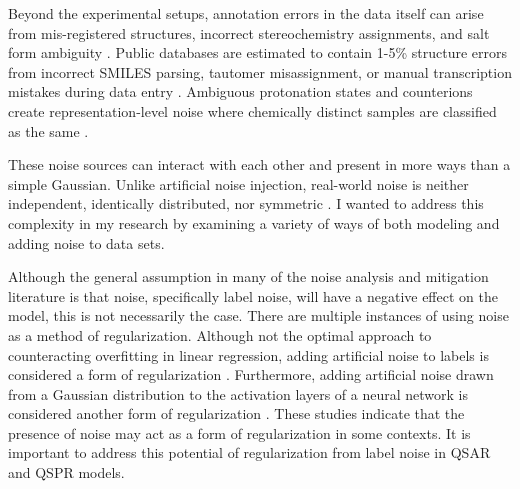 Beyond the experimental setups, annotation errors in the data itself can arise from mis-registered structures, incorrect stereochemistry assignments, and salt form ambiguity \citep{Williams2017}. Public databases are estimated to contain 1-5\% structure errors from incorrect SMILES parsing, tautomer misassignment, or manual transcription mistakes during data entry \citep{Young2008}. Ambiguous protonation states and counterions create representation-level noise where chemically distinct samples are classified as the same \citep{Bento2020}.

These noise sources can interact with each other and present in more ways than a simple Gaussian. Unlike artificial noise injection, real-world noise is neither independent, identically distributed, nor symmetric  \citep{Heid2023}. I wanted to address this complexity in my research by examining a variety of ways of both modeling and adding noise to data sets. 

Although the general assumption in many of the noise analysis and mitigation literature is that noise, specifically label noise, will have a negative effect on the model, this is not necessarily the case. There are multiple instances of using noise as a method of regularization. Although not the optimal approach to counteracting overfitting in linear regression, adding artificial noise to labels is considered a form of regularization \citep{Ullah2024}. Furthermore, adding artificial noise drawn from a Gaussian distribution to the activation layers of a neural network is considered another form of regularization \citep{Camuto2021}. These studies indicate that the presence of noise may act as a form of regularization in some contexts. It is important to address this potential of regularization from label noise in QSAR and QSPR models.


